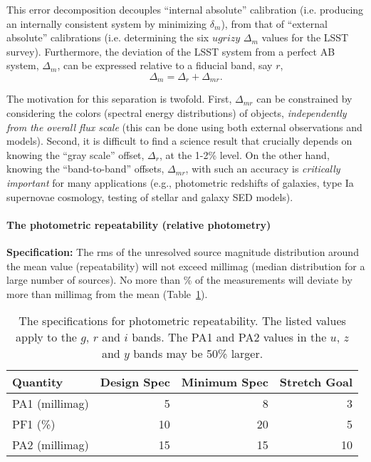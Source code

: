 This error decomposition decouples ``internal absolute'' calibration
(i.e. producing an internally consistent system by minimizing $\delta_m$),
from that of ``external absolute'' calibrations (i.e. determining the six
$ugrizy$ $\Delta_m$  values for the LSST survey). Furthermore, the deviation
of the LSST system from a perfect AB system, $\Delta_m$, can be expressed
relative to a fiducial band, say $r$,
\begin{equation}
            \Delta_m = \Delta_r + \Delta_{mr}.
\end{equation}

The motivation for this separation is twofold. First, $\Delta_{mr}$ can
be constrained by considering the colors (spectral energy distributions)
of objects, {\it independently from the overall flux scale} (this can
be done using both external observations and models). Second, it is difficult
to find a science result that crucially depends on knowing the ``gray
scale'' offset, $\Delta_r$, at the 1-2\% level. On the other hand,
knowing the ``band-to-band'' offsets, $\Delta_{mr}$, with such an
accuracy is {\it critically important} for many applications (e.g.,
photometric redshifts of galaxies, type Ia supernovae cosmology, testing
of stellar and galaxy SED models).



\paragraph{The photometric repeatability (relative photometry)\\}

{\bf Specification:} The rms of the unresolved source magnitude
distribution around the mean value (repeatability) will not exceed
millimag (median distribution for a large number of sources). No more than
\% of the measurements will deviate by more than
 millimag from the mean (Table~\ref{relPhotometry}).


\begin{table}[h]
\begin{tabular}{|l|r|r|r|}
\hline
Quantity   & Design Spec & Minimum Spec & Stretch Goal   \\
\hline
      PA1 (millimag)  &     5       &       8      &        3  \\
      PF1  (\%)       &    10       &      20      &        5  \\
      PA2 (millimag)  &    15       &      15      &       10  \\
\hline
\end{tabular}
\caption{The specifications for photometric repeatability. The listed
values apply to the $g$, $r$ and $i$ bands.  The PA1 and PA2 values in
the $u$, $z$ and $y$ bands may be 50\% larger.}
\label{relPhotometry}
\end{table}

